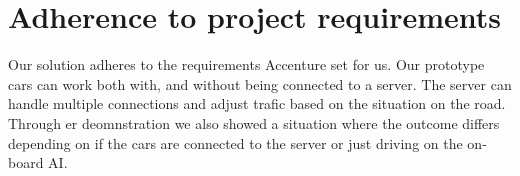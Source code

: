 \section{Adherence to project requirements}
Our solution adheres to the requirements Accenture set for us. Our prototype cars can work both with, and without being connected to a server. The server can handle multiple connections and adjust trafic based on the situation on the road. Through er deomnstration we also showed a situation where the outcome differs depending on if the cars are connected to the server or just driving on the on-board AI.

